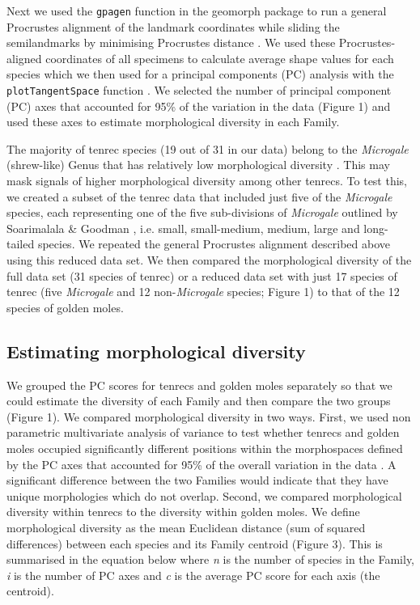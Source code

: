 \documentclass[12pt,a4paper]{article}
\begin{document}
	Next we used the \texttt{gpagen} function in the geomorph package \citep{Adams2013} to run a general Procrustes alignment \citep{Rohlf1993} of the landmark coordinates while sliding the semilandmarks by minimising Procrustes distance \citep{Bookstein1997}. We used these Procrustes-aligned coordinates of all specimens to calculate average shape values for each species which we then used for a principal components (PC) analysis with the \texttt{plotTangentSpace} function \citep{Adams2013}. We selected the number of principal component (PC) axes that accounted for 95\% of the variation in the data (Figure 1) and used these axes to estimate morphological diversity in each Family. 

 	The majority of tenrec species (19 out of 31 in our data) belong to the \textit{Microgale} (shrew-like) Genus that has relatively low morphological diversity \citep{Soarimalala2011, Jenkins2003}. This may mask signals of higher morphological diversity among other tenrecs. To test this, we created a subset of the tenrec data that included just five of the \textit{Microgale} species, each representing one of the five sub-divisions of \textit{Microgale} outlined by Soarimalala \& Goodman \citeyearpar{Soarimalala2011}, i.e. small, small-medium, medium, large and long-tailed species. We repeated the general Procrustes alignment described above using this reduced data set. We then compared the morphological diversity of the full data set (31 species of tenrec) or a reduced data set with just 17 species of tenrec (five \textit{Microgale} and 12 non-\textit{Microgale} species; Figure 1) to that of the 12 species of golden moles.
	
\subsection{Estimating morphological diversity}
	
	We grouped the PC scores for tenrecs and golden moles separately so that we could estimate the diversity of each Family and then compare the two groups (Figure 1). We compared morphological diversity in two ways. First, we used non parametric multivariate analysis of variance \citep[npMANOVA;][]{Anderson2001} to test whether tenrecs and golden moles occupied significantly different positions within the morphospaces defined by the PC axes that accounted for 95\% of the overall variation in the data \citep[e.g.][]{Serb2011, Ruta2013}. A significant difference between the two Families would indicate that they have unique morphologies which do not overlap. Second, we compared morphological diversity within tenrecs to the diversity within golden moles. We define morphological diversity as the mean Euclidean distance (sum of squared differences) between each species and its Family centroid (Figure 3). This is summarised in the equation below where \textit{n} is the number of species in the Family, \textit{i} is the number of PC axes and \textit{c} is the average PC score for each axis (the centroid). 
	
\end{document}
